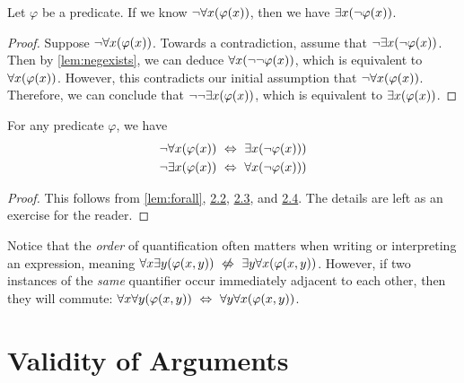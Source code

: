 \begin{lemma}\label{lem:negforall}
    Let \(\varphi\) be a predicate.
    If we know \(\neg \forall x \pn*{\varphi(x)}\), then we have \(\exists x \pn*{\neg \varphi(x)}\).
\end{lemma}
\begin{proof}
    Suppose \(\neg \forall x \pn*{\varphi(x)}\).
    Towards a contradiction, assume that \(\neg \exists x \pn*{\neg \varphi(x)}\).
    Then by \autoref{lem:negexists}, we can deduce \(\forall x \pn*{\neg \neg \varphi(x)}\),
    which is equivalent to \(\forall x \pn*{\varphi(x)}\).
    However, this contradicts our initial assumption that \(\neg \forall x \pn*{\varphi(x)}\). \contradiction
    Therefore, we can conclude that \(\neg \neg \exists x \pn*{\varphi(x)}\),
    which is equivalent to \(\exists x \pn*{\varphi(x)}\).
\end{proof}

\begin{theorem}
    For any predicate \(\varphi\), we have
    \begin{align*}
        \neg \forall x \pn*{\varphi(x)} &\iff \exists x \pn*{\neg \varphi(x))}\\
        \neg \exists x \pn*{\varphi(x)} &\iff \forall x \pn*{\neg \varphi(x))}\\
    \end{align*}
\end{theorem}
\begin{proof}
    This follows from \autoref{lem:forall}, \hyperref[lem:negexists]{2.2}, \hyperref[lem:exists]{2.3},
    and \hyperref[lem:negforall]{2.4}.
    The details are left as an exercise for the reader.
\end{proof}

\begin{remark}
    Notice that the \emph{order} of quantification often matters when writing or interpreting an expression,
    meaning \(\forall x \exists y \pn*{\varphi(x, y)} \niff \exists y \forall x \pn*{\varphi(x, y)}\).
    However, if two instances of the \emph{same} quantifier occur immediately adjacent to each other,
    then they will commute: \(\forall x \forall y \pn*{\varphi(x, y)} \iff \forall y \forall x \pn*{\varphi(x, y)}\).
\end{remark}

\newpage
\section{Validity of Arguments}

